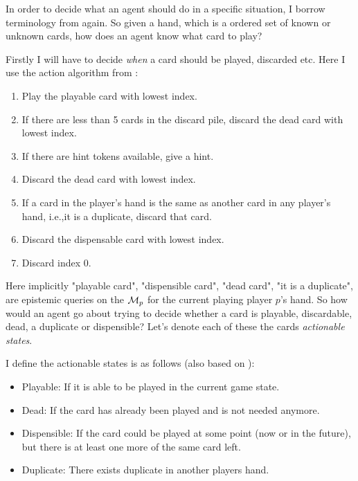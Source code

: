 In order to decide what an agent should do in a specific situation, I borrow terminology from \cite{CoxEtAl2015} again. So given a hand, which is a ordered set of known or unknown cards, how does an agent know what card to play?





Firstly I will have to decide \emph{when} a card should be played, discarded etc. Here I use the action algorithm from \cite{CoxEtAl2015}:
\begin{enumerate}
	\item Play the playable card with lowest index.
	\item If there are less than 5 cards in the discard pile, discard the dead card with lowest index.
	\item If there are hint tokens available, give a hint.
	\item Discard the dead card with lowest index.
	\item If a card in the player’s hand is the same as another card in any player’s hand, i.e.,it is a duplicate, discard that card.
	\item Discard the dispensable card with lowest index.
	\item Discard index 0.
\end{enumerate}

Here implicitly "playable card", "dispensible card", "dead card", "it is a duplicate", are epistemic queries on the $\mathcal{M}_p$ for the current playing player $p$'s hand. So how would an agent go about trying to decide whether a card is playable, discardable, dead, a duplicate or dispensible? Let's denote each of these the cards \emph{actionable states}.

I define the actionable states is as follows (also based on \cite{CoxEtAl2015}):
\begin{itemize}
	\item Playable: If it is able to be played in the current game state.
	\item Dead: If the card has already been played and is not needed anymore.
	\item Dispensible: If the card could be played at some point (now or in the future), but there is at least one more of the same card left.
	\item Duplicate: There exists duplicate in another players hand.
\end{itemize}

